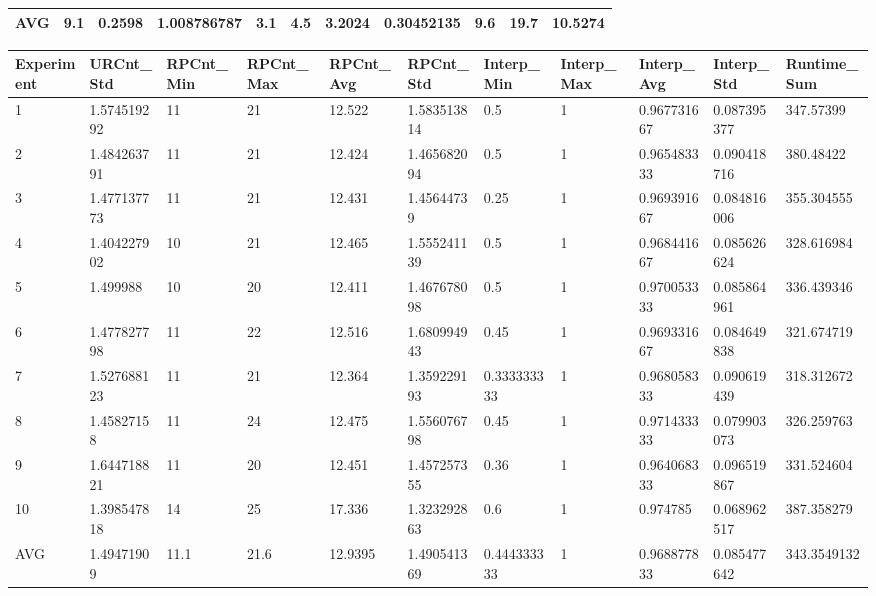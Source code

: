 \begin{table}[H]
\begin{adjustbox}{max width=380pt,keepaspectratio,angle=90}
\begin{tabular}{|l|l|l|l|l|l|l|l|l|l|l|}
					AVG        & 9.1       & 0.2598    & 1.008786787 & 3.1          & 4.5          & 3.2024       & 0.30452135   & 9.6        & 19.7       & 10.5274    \\ \hline
				\end{tabular}	
			\end{adjustbox}
			\begin{adjustbox}{max width=380pt,keepaspectratio,angle=90}
				\begin{tabular}{|l|l|l|l|l|l|l|l|l|l|l|}
					\rowcolor[HTML]{EFEFEF} 
					\hline
					Experiment & URCnt\_Std  & RPCnt\_Min & RPCnt\_Max & RPCnt\_Avg & RPCnt\_Std  & Interp\_Min & Interp\_Max & Interp\_Avg & Interp\_Std & Runtime\_Sum \\ \hline
					1          & 1.574519292 & 11         & 21         & 12.522     & 1.583513814 & 0.5         & 1           & 0.967731667 & 0.087395377 & 347.57399    \\ \hline
					2          & 1.484263791 & 11         & 21         & 12.424     & 1.465682094 & 0.5         & 1           & 0.965483333 & 0.090418716 & 380.48422    \\ \hline
					3          & 1.477137773 & 11         & 21         & 12.431     & 1.45644739  & 0.25        & 1           & 0.969391667 & 0.084816006 & 355.304555   \\ \hline
					4          & 1.404227902 & 10         & 21         & 12.465     & 1.555241139 & 0.5         & 1           & 0.968441667 & 0.085626624 & 328.616984   \\ \hline
					5          & 1.499988    & 10         & 20         & 12.411     & 1.467678098 & 0.5         & 1           & 0.970053333 & 0.085864961 & 336.439346   \\ \hline
					6          & 1.477827798 & 11         & 22         & 12.516     & 1.680994943 & 0.45        & 1           & 0.969331667 & 0.084649838 & 321.674719   \\ \hline
					7          & 1.527688123 & 11         & 21         & 12.364     & 1.359229193 & 0.333333333 & 1           & 0.968058333 & 0.090619439 & 318.312672   \\ \hline
					8          & 1.45827158  & 11         & 24         & 12.475     & 1.556076798 & 0.45        & 1           & 0.971433333 & 0.079903073 & 326.259763   \\ \hline
					9          & 1.644718821 & 11         & 20         & 12.451     & 1.457257355 & 0.36        & 1           & 0.964068333 & 0.096519867 & 331.524604   \\ \hline
					10         & 1.398547818 & 14         & 25         & 17.336     & 1.323292863 & 0.6         & 1           & 0.974785    & 0.068962517 & 387.358279   \\ \hline\hline
					AVG        & 1.49471909  & 11.1       & 21.6       & 12.9395    & 1.490541369 & 0.444333333 & 1           & 0.968877833 & 0.085477642 & 343.3549132  \\ \hline
				\end{tabular}
			\end{adjustbox}	
		\end{table}
